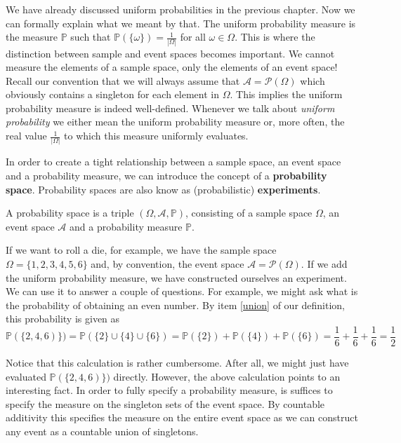 \documentclass[a4paper,11pt,leqno]{report}
\begin{document}
We have already discussed uniform probabilities in the previous chapter. Now we can formally explain
what we meant by that. The uniform probability measure is the measure $ \mathbb{P} $ such that
$ \mathbb{P}(\{\omega\}) = \frac{1}{|\Omega|} $ for all $ \omega \in \Omega $. This is where the
distinction between sample and event spaces becomes important. We cannot measure the elements of a
sample space, only the elements of an event space! Recall our convention that we will always assume
that $ \mathcal{A} = \mathcal{P}(\Omega) $ which obviously contains a singleton for each element in
$ \Omega $. This implies the uniform probability measure is indeed well-defined. Whenever we talk about
\textit{uniform probability} we either mean the uniform probability measure or, more often, the real
value $ \frac{1}{|\Omega|} $ to which this measure uniformly evaluates.

In order to create a tight relationship between a sample space, an event space and a probability measure,
we can introduce the concept of a \textbf{probability space}. Probability spaces are also know as 
(probabilistic) \textbf{experiments}.

\begin{Definition} \label{ProbabiltySpace}
A probability space is a triple $ (\Omega, \mathcal{A}, \mathbb{P}) $, consisting of a sample space $ \Omega $,
an event space $ \mathcal{A} $ and a probability measure $ \mathbb{P} $.
\end{Definition}

If we want to roll a die, for example, we have the sample space $ \Omega = \{1,2,3,4,5,6\} $ and, by 
convention, the event space $ \mathcal{A} = \mathcal{P}(\Omega) $. If we add the uniform probability measure, 
we have constructed ourselves an experiment. We can use it to answer a couple of questions. For example, we 
might ask what is the probability of obtaining an even number. By item \ref{union} of our definition, this 
probability is given as
\begin{equation}
\mathbb{P}(\{2,4,6)\}) = \mathbb{P}(\{2\} \cup \{4\} \cup \{6\}) = \mathbb{P}(\{2
\}) + \mathbb{P}(\{4\})
+ \mathbb{P}(\{6\}) = \frac{1}{6} + \frac{1}{6} + \frac{1}{6} = \frac{1}{2}
\end{equation}

Notice that this calculation is rather cumbersome. After all, we might just have evaluated 
$ \mathbb{P}(\{2,4,6)\}) $ directly. However, the above calculation points to an interesting fact. In order
to fully specify a probability measure, is suffices to specify the measure on the singleton sets of the
event space. By countable additivity this specifies the measure on the entire event space as we can
construct any event as a countable union of singletons.
\end{document}
